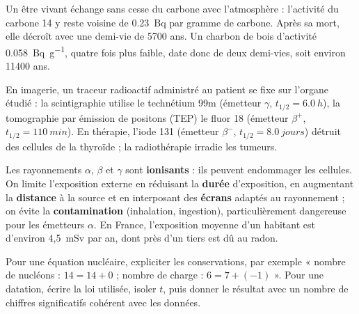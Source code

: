 \begin{exemple}
Un être vivant échange sans cesse du carbone avec l'atmosphère : l'activité du carbone 14 y reste voisine de
\qty{0,23}{Bq} par gramme de carbone. Après sa mort, elle décroît avec une demi-vie de \num{5700} ans. Un charbon de
bois d'activité \qty{0,058}{Bq.g^{-1}}, quatre fois plus faible, date donc de deux demi-vies, soit environ \num{11400} ans.
\end{exemple}
\begin{propriete}
En imagerie, un traceur radioactif administré au patient se fixe sur l'organe étudié : la scintigraphie utilise
le technétium 99m (émetteur $\gamma$, $t_{1/2}=\qty{6,0}{h}$), la tomographie par émission de positons (TEP) le
fluor 18 (émetteur $\beta^+$, $t_{1/2}=\qty{110}{min}$). En thérapie, l'iode 131 (émetteur $\beta^-$,
$t_{1/2}=\qty{8,0}{jours}$) détruit des cellules de la thyroïde ; la radiothérapie irradie les tumeurs.
\end{propriete}
\begin{propriete}
Les rayonnements $\alpha$, $\beta$ et $\gamma$ sont \textbf{ionisants} : ils peuvent endommager les cellules. On limite
l'exposition externe en réduisant la \textbf{durée} d'exposition, en augmentant la \textbf{distance} à la source et
en interposant des \textbf{écrans} adaptés au rayonnement ; on évite la \textbf{contamination} (inhalation,
ingestion), particulièrement dangereuse pour les émetteurs $\alpha$. En France, l'exposition moyenne d'un habitant est
d'environ 4,5~mSv par an, dont près d'un tiers est dû au radon.
\end{propriete}
\begin{rediger}
Pour une équation nucléaire, expliciter les conservations, par exemple « nombre de nucléons : $14=14+0$ ; nombre de
charge : $6=7+(-1)$ ». Pour une datation, écrire la loi utilisée, isoler $t$, puis donner le résultat avec un nombre
de chiffres significatifs cohérent avec les données.
\end{rediger}
\exercices

